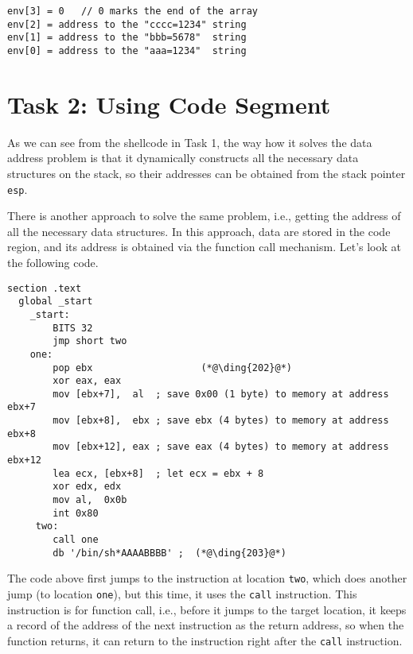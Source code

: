 \begin{lstlisting}
env[3] = 0   // 0 marks the end of the array
env[2] = address to the "cccc=1234" string
env[1] = address to the "bbb=5678"  string
env[0] = address to the "aaa=1234"  string
\end{lstlisting}









\section{Task 2: Using Code Segment}

As we can see from the shellcode in Task 1, 
the way how it solves the data address problem is that 
it dynamically constructs all the necessary 
data structures on the stack,
so their addresses can be obtained from the 
stack pointer \texttt{esp}.

There is another approach to solve the same problem,
i.e., getting the address of all the necessary
data structures. In this approach, data are stored in the code
region, and its address is obtained 
via the function call mechanism. Let's look at the following
code. 

\begin{lstlisting}[caption={\texttt{mysh2.s}}]
section .text
  global _start
    _start:
        BITS 32
        jmp short two
    one:
        pop ebx                   (*@\ding{202}@*)
        xor eax, eax
        mov [ebx+7],  al  ; save 0x00 (1 byte) to memory at address ebx+7
        mov [ebx+8],  ebx ; save ebx (4 bytes) to memory at address ebx+8
        mov [ebx+12], eax ; save eax (4 bytes) to memory at address ebx+12
        lea ecx, [ebx+8]  ; let ecx = ebx + 8
        xor edx, edx
        mov al,  0x0b
        int 0x80
     two:
        call one
        db '/bin/sh*AAAABBBB' ;  (*@\ding{203}@*)
\end{lstlisting}

The code above first jumps to the instruction at 
location \texttt{two}, which does another 
jump (to location \texttt{one}), but this time,
it uses the \texttt{call} instruction.  This instruction 
is for function call, i.e., before it jumps to
the target location, it keeps a record of the address
of the next instruction as the return address, so when
the function returns, it can return to the 
instruction right after the \texttt{call} instruction.  

